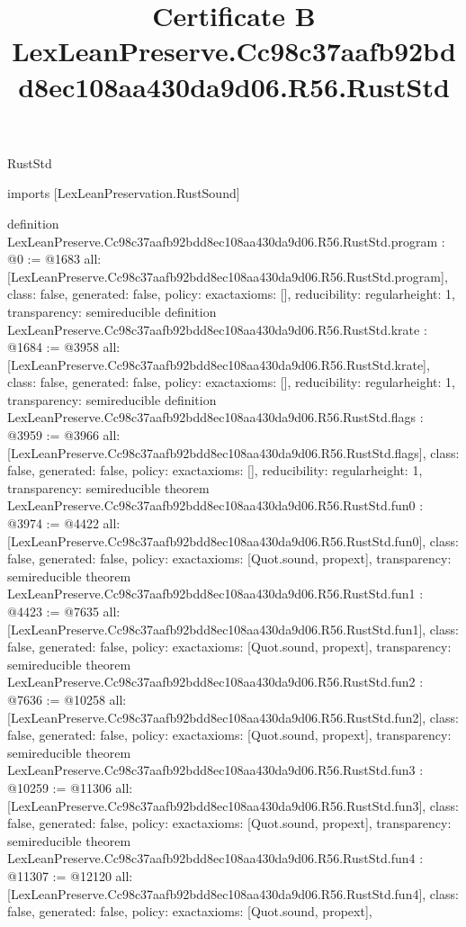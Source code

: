 \begin{lexlean}{RustStd}
\title{Certificate B LexLeanPreserve.Cc98c37aafb92bdd8ec108aa430da9d06.R56.RustStd}
\begin{coremodule}
imports [LexLeanPreservation.RustSound]

definition LexLeanPreserve.Cc98c37aafb92bdd8ec108aa430da9d06.R56.RustStd.program : @0 := @1683 {
  all: [LexLeanPreserve.Cc98c37aafb92bdd8ec108aa430da9d06.R56.RustStd.program],
  class: false,
  generated: false,
  policy: exact{axioms: []},
  reducibility: regular{height: 1},
  transparency: semireducible
}
definition LexLeanPreserve.Cc98c37aafb92bdd8ec108aa430da9d06.R56.RustStd.krate : @1684 := @3958 {
  all: [LexLeanPreserve.Cc98c37aafb92bdd8ec108aa430da9d06.R56.RustStd.krate],
  class: false,
  generated: false,
  policy: exact{axioms: []},
  reducibility: regular{height: 1},
  transparency: semireducible
}
definition LexLeanPreserve.Cc98c37aafb92bdd8ec108aa430da9d06.R56.RustStd.flags : @3959 := @3966 {
  all: [LexLeanPreserve.Cc98c37aafb92bdd8ec108aa430da9d06.R56.RustStd.flags],
  class: false,
  generated: false,
  policy: exact{axioms: []},
  reducibility: regular{height: 1},
  transparency: semireducible
}
theorem LexLeanPreserve.Cc98c37aafb92bdd8ec108aa430da9d06.R56.RustStd.fun0 : @3974 := @4422 {
  all: [LexLeanPreserve.Cc98c37aafb92bdd8ec108aa430da9d06.R56.RustStd.fun0],
  class: false,
  generated: false,
  policy: exact{axioms: [Quot.sound, propext]},
  transparency: semireducible
}
theorem LexLeanPreserve.Cc98c37aafb92bdd8ec108aa430da9d06.R56.RustStd.fun1 : @4423 := @7635 {
  all: [LexLeanPreserve.Cc98c37aafb92bdd8ec108aa430da9d06.R56.RustStd.fun1],
  class: false,
  generated: false,
  policy: exact{axioms: [Quot.sound, propext]},
  transparency: semireducible
}
theorem LexLeanPreserve.Cc98c37aafb92bdd8ec108aa430da9d06.R56.RustStd.fun2 : @7636 := @10258 {
  all: [LexLeanPreserve.Cc98c37aafb92bdd8ec108aa430da9d06.R56.RustStd.fun2],
  class: false,
  generated: false,
  policy: exact{axioms: [Quot.sound, propext]},
  transparency: semireducible
}
theorem LexLeanPreserve.Cc98c37aafb92bdd8ec108aa430da9d06.R56.RustStd.fun3 : @10259 := @11306 {
  all: [LexLeanPreserve.Cc98c37aafb92bdd8ec108aa430da9d06.R56.RustStd.fun3],
  class: false,
  generated: false,
  policy: exact{axioms: [Quot.sound, propext]},
  transparency: semireducible
}
theorem LexLeanPreserve.Cc98c37aafb92bdd8ec108aa430da9d06.R56.RustStd.fun4 : @11307 := @12120 {
  all: [LexLeanPreserve.Cc98c37aafb92bdd8ec108aa430da9d06.R56.RustStd.fun4],
  class: false,
  generated: false,
  policy: exact{axioms: [Quot.sound, propext]},
}
\end{coremodule}
\end{lexlean}
